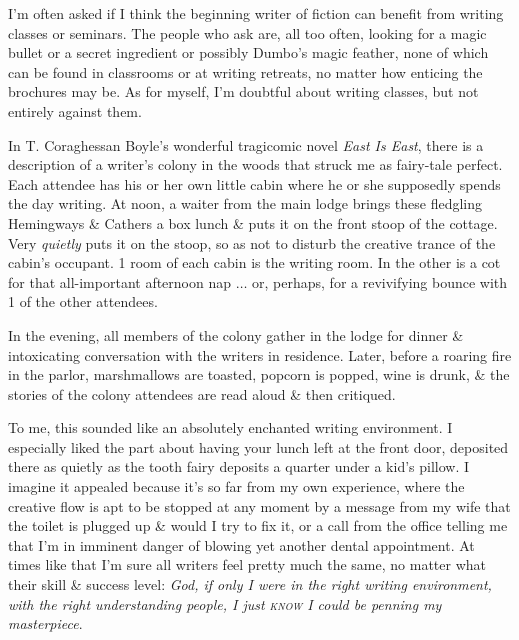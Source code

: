 \documentclass{article}
\numberwithin{equation}{section}
\begin{document}
 I'm often asked if I think the beginning writer of fiction can benefit from writing classes or seminars. The people who ask are, all too often, looking for a magic bullet or a secret ingredient or possibly Dumbo's magic feather, none of which can be found in classrooms or at writing retreats, no matter how enticing the brochures may be. As for myself, I'm doubtful about writing classes, but not entirely against them.

In T. Coraghessan Boyle's wonderful tragicomic novel \textit{East Is East}, there is a description of a writer's colony in the woods that struck me as fairy-tale perfect. Each attendee has his or her own little cabin where he or she supposedly spends the day writing. At noon, a waiter from the main lodge brings these fledgling Hemingways \& Cathers a box lunch \& puts it on the front stoop of the cottage. Very \textit{quietly} puts it on the stoop, so as not to disturb the creative trance of the cabin's occupant. 1 room of each cabin is the writing room. In the other is a cot for that all-important afternoon nap $\ldots$ or, perhaps, for a revivifying bounce with 1 of the other attendees.

In the evening, all members of the colony gather in the lodge for dinner \& intoxicating conversation with the writers in residence. Later, before a roaring fire in the parlor, marshmallows are toasted, popcorn is popped, wine is drunk, \& the stories of the colony attendees are read aloud \& then critiqued.

To me, this sounded like an absolutely enchanted writing environment. I especially liked the part about having your lunch left at the front door, deposited there as quietly as the tooth fairy deposits a quarter under a kid's pillow. I imagine it appealed because it's so far from my own experience, where the creative flow is apt to be stopped at any moment by a message from my wife that the toilet is plugged up \& would I try to fix it, or a call from the office telling me that I'm in imminent danger of blowing yet another dental appointment. At times like that I'm sure all writers feel pretty much the same, no matter what their skill \& success level: \textit{God, if only I were in the right writing environment, with the right understanding people, I just \textsc{know} I could be penning my masterpiece}.
\end{document}
